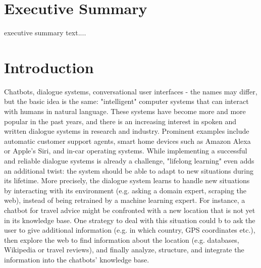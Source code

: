 \documentclass{lihlith}
\theoremstyle{definition}
\theoremstyle{remark}
\begin{document}


\cleardoublepage
\begin{nwrrevisions}

\end{nwrrevisions}

\cleardoublepage
\section*{Executive Summary}

executive summary text....


\cleardoublepage
\tableofcontents
\cleardoublepage






\section{Introduction}
\label{sec:intro}
Chatbots, dialogue systems, conversational user interfaces - the names may differ, but the basic idea is the same: "intelligent" computer systems that can interact with humans in natural language. These systems have become more and more popular in the past years, and there is an increasing interest in spoken and written dialogue systems in research and industry. Prominent examples include automatic customer support agents, smart home devices such as Amazon Alexa or Apple's Siri, and in-car operating systems. 
While implementing a successful and reliable dialogue systems is already a challenge, "lifelong learning" even adds an additional twist: the system should be able to adapt to new situations during its lifetime. More precisely, the dialogue system learns to handle new situations by interacting with its environment (e.g. asking a domain expert, scraping the web), instead of being retrained by a machine learning expert. For instance, a chatbot for travel advice might be confronted with a new location that is not yet in its knowledge base. One strategy to deal with this situation could b to ask the user to give additional information (e.g. in which country, GPS coordinates etc.), then explore the web to find information about the location (e.g. databases, Wikipedia or travel reviews), and finally analyze, structure, and integrate the information into the chatbots' knowledge base. 
\end{document}
